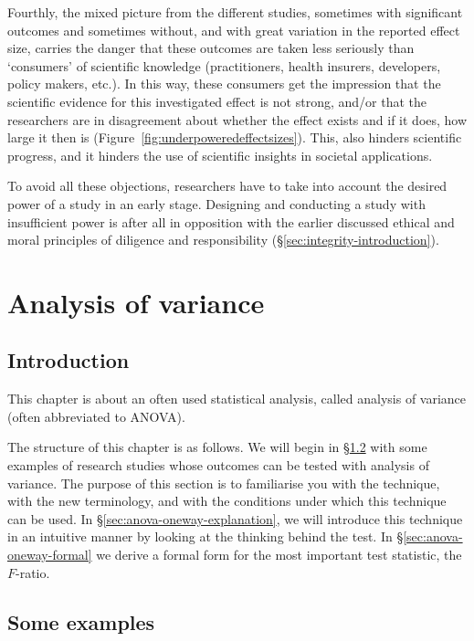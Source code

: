 \documentclass[
]{book}
\begin{document}
Fourthly, the mixed picture from the different studies, sometimes with significant
outcomes and sometimes without, and with great variation in the reported
effect size, carries the danger that these
outcomes are taken less seriously than `consumers' of
scientific knowledge (practitioners, health insurers, developers,
policy makers, etc.). In this way, these consumers get the impression
that the scientific evidence for this investigated effect is not strong,
and/or that the researchers are in disagreement about whether the effect exists
and if it does, how large it then is \citep{Kolf93} (Figure~\ref{fig:underpoweredeffectsizes}).
This, also hinders scientific progress, and it hinders the use
of scientific insights in societal applications.

To avoid all these objections, researchers have to take into account
the desired power of a study in an early stage. Designing and conducting
a study with insufficient power is after all in opposition with the earlier discussed
ethical and moral principles of diligence and responsibility
(§\ref{sec:integrity-introduction}).

\hypertarget{ch-anova}{%
\chapter{Analysis of variance}\label{ch-anova}}

\hypertarget{sec:introduction}{%
\section{Introduction}\label{sec:introduction}}

This chapter is about an often used statistical analysis, called
analysis of variance (often abbreviated to ANOVA).

The structure of this chapter is as follows. We will begin in §\ref{sec:anova-examples}
with some examples of research studies whose outcomes
can be tested with analysis of variance. The purpose of this section
is to familiarise you with the technique,
with the new terminology, and with the conditions under which this technique
can be used. In §\ref{sec:anova-oneway-explanation}, we will introduce this technique
in an intuitive manner by looking at the thinking behind the test. In
§\ref{sec:anova-oneway-formal} we derive a formal form for the most important
test statistic, the \(F\)-ratio.

\hypertarget{sec:anova-examples}{%
\section{Some examples}\label{sec:anova-examples}}
\end{document}
